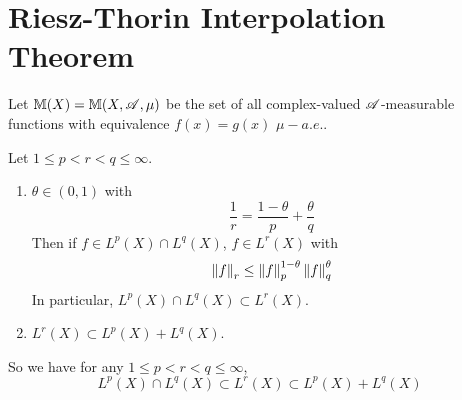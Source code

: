 \section{Riesz-Thorin Interpolation Theorem}
Let $\mathbb{M}(X)=\mathbb{M}(X,\mathscr{A},\mu)$ be the set of all complex-valued $\mathscr{A}$-measurable functions with equivalence $f(x)=g(x)$ $\mu-a.e.$.

\begin{prop}\label{pro:geneholder}
	Let $1 \leq p < r < q \leq \infty$.
	\begin{enumerate}[label=(\arabic{*})]
		\item $\theta \in (0,1)$ with
		\begin{equation*}
			\frac{1}{r} = \frac{1 - \theta}{p} + \frac{\theta}{q}
		\end{equation*}
		Then if $f \in L^p(X) \cap L^q(X)$, $f \in L^r(X)$ with
		\begin{equation*}
			\left\lVert f\right\lVert_r \leq \left\lVert f\right\lVert^{1-\theta}_p\left\lVert f\right\lVert^\theta_q
		\end{equation*}
		In particular, $L^p(X) \cap L^q(X) \subset L^r(X)$.

		\item $L^r(X) \subset L^p(X) + L^q(X)$.
	\end{enumerate}
	So we have for any $1 \leq p < r < q \leq \infty$,
	\begin{equation*}
		L^p(X) \cap L^q(X) \subset L^r(X) \subset L^p(X)+L^q(X)
	\end{equation*}
\end{prop}
